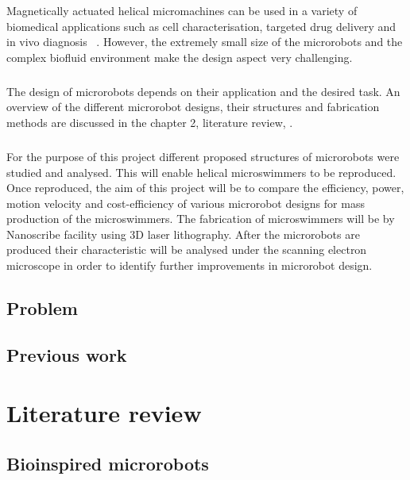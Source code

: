 \documentclass[12pt,a4paper,titlepage]{report}
\begin{document}
Magnetically actuated helical micromachines can be used
 in a variety of biomedical applications such as cell characterisation, targeted drug delivery and in vivo 
diagnosis ~\citep{peyer2013magnetic}. However, the extremely small size of the microrobots and the
complex biofluid environment make the design aspect
very challenging. 


\paragraph{}
The design of microrobots depends on their application and the desired task. An overview of the different
 microrobot designs, their structures and fabrication methods are discussed in the chapter 2, literature review, .

\paragraph{}
For the purpose of this project different proposed structures of microrobots were studied
 and analysed. This will enable helical microswimmers to be reproduced. Once reproduced, the aim of this project will be to compare
 the efficiency, power, motion velocity and cost-efficiency of various microrobot designs for mass production
 of the microswimmers. The fabrication of microswimmers will be by Nanoscribe facility using 3D laser
 lithography. After the microrobots are produced their characteristic will be analysed
 under the scanning electron microscope in order to identify further improvements in microrobot design. 

\section{Problem}

\section{Previous work}



\chapter{Literature review}
 


\section{Bioinspired microrobots}
\end{document}
